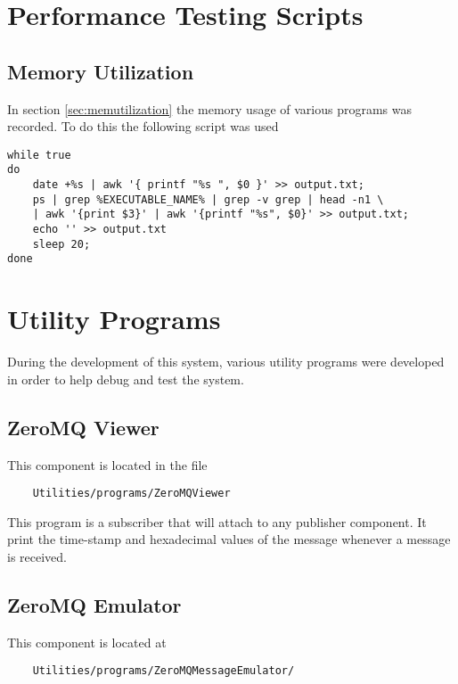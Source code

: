 \chapter{Performance Testing Scripts}

\section{Memory Utilization}

In section \ref{sec:memutilization} the memory usage of various programs was recorded. To do this the following script was used

\begin{verbatim}
while true
do
	date +%s | awk '{ printf "%s ", $0 }' >> output.txt;
	ps | grep %EXECUTABLE_NAME% | grep -v grep | head -n1 \
	| awk '{print $3}' | awk '{printf "%s", $0}' >> output.txt;
	echo '' >> output.txt
	sleep 20;
done

\end{verbatim}

\chapter{Utility Programs}
\label{app:sec:utilities}

During the development of this system, various utility programs were developed in order to help debug and test the system.

\section{ZeroMQ Viewer}

This component is located in the file 

\begin{verbatim}
	Utilities/programs/ZeroMQViewer
\end{verbatim}

This program is a subscriber that will attach to any publisher component. It print the time-stamp and hexadecimal values of the message whenever a message is received.

\section{ZeroMQ Emulator}

This component is located at 

\begin{verbatim}
	Utilities/programs/ZeroMQMessageEmulator/
\end{verbatim}

